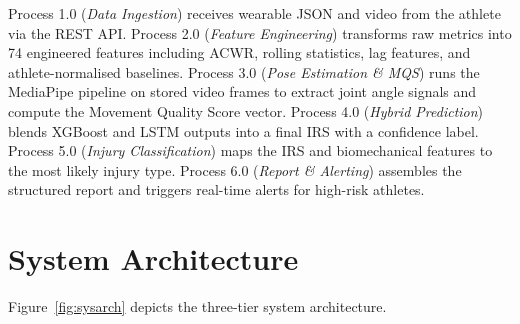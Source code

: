 \documentclass[12pt,a4paper]{report}
\begin{document}
Process 1.0 (\textit{Data Ingestion}) receives wearable JSON and video from the athlete via the REST API. Process 2.0 (\textit{Feature Engineering}) transforms raw metrics into 74 engineered features including ACWR, rolling statistics, lag features, and athlete-normalised baselines. Process 3.0 (\textit{Pose Estimation \& MQS}) runs the MediaPipe pipeline on stored video frames to extract joint angle signals and compute the Movement Quality Score vector. Process 4.0 (\textit{Hybrid Prediction}) blends XGBoost and LSTM outputs into a final IRS with a confidence label. Process 5.0 (\textit{Injury Classification}) maps the IRS and biomechanical features to the most likely injury type. Process 6.0 (\textit{Report \& Alerting}) assembles the structured report and triggers real-time alerts for high-risk athletes.

\section{System Architecture}

Figure~\ref{fig:sysarch} depicts the three-tier system architecture.
\end{document}
